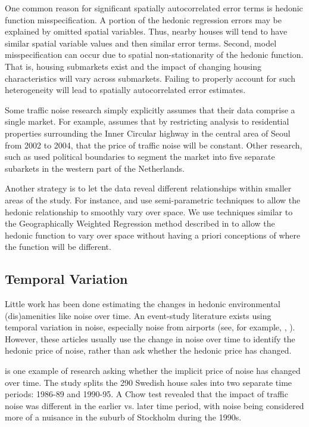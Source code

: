 \documentclass{article}\usepackage{graphicx, color}
\begin{document}
One common reason for significant spatially autocorrelated error terms is hedonic function misspecification. A portion of the hedonic regression errors may be explained by omitted spatial variables. Thus, nearby houses will tend to have similar spatial variable values and then similar error terms. Second, model misspecification can occur due to spatial non-stationarity of the hedonic function. That is, housing submarkets exist and the impact of changing housing characteristics will vary across submarkets. Failing to properly account for such heterogeneity will lead to spatially autocorrelated error estimates.

Some traffic noise research simply explicitly assumes that their data comprise a single market. For example, \citet{Kim2007} assumes that by restricting analysis to residential properties surrounding the Inner Circular highway in the central area of Seoul from 2002 to 2004, that the price of traffic noise will be constant. Other research, such as \citet{Theebe2004a} used political boundaries to segment the market into five separate subarkets in the western part of the Netherlands.

Another strategy is to let the data reveal different relationships within smaller areas of the study. For instance, \citet{Day2007} and \citet{MarmolejoDuarteCarlos;GonzalezTamez2009} use semi-parametric techniques to allow the hedonic relationship to smoothly vary over space. We use techniques similar to the Geographically Weighted Regression method described in \citet{MarmolejoDuarteCarlos;GonzalezTamez2009} to allow the hedonic function to vary over space without having a priori conceptions of where the function will be different. 


\subsection{Temporal Variation}
Little work has been done estimating the changes in hedonic environmental (dis)amenities like noise over time. An event-study literature exists using temporal variation in noise, especially noise from airports (see, for example, \citet{Cohen2009}, ). However, these articles usually use the change in noise over time to identify the hedonic price of noise, rather than ask whether the hedonic price has changed.

\citet{Wilhelmsson2000} is one example of research asking whether the implicit price of noise has changed over time. The study splits the 290 Swedish house sales into two separate time periods: 1986-89 and 1990-95. A Chow test revealed that the impact of traffic noise was different in the earlier vs. later time period, with noise being considered more of a nuisance in the suburb of Stockholm during the 1990s. 
\end{document}
